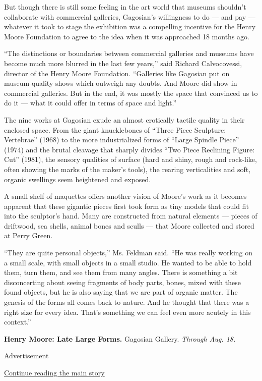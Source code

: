 But though there is still some feeling in the art world that museums
shouldn't collaborate with commercial galleries, Gagosian's willingness
to do --- and pay --- whatever it took to stage the exhibition was a
compelling incentive for the Henry Moore Foundation to agree to the idea
when it was approached 18 months ago.

``The distinctions or boundaries between commercial galleries and
museums have become much more blurred in the last few years,'' said
Richard Calvocovessi, director of the Henry Moore Foundation.
``Galleries like Gagosian put on museum-quality shows which outweigh any
doubts. And Moore did show in commercial galleries. But in the end, it
was mostly the space that convinced us to do it --- what it could offer
in terms of space and light.''

The nine works at Gagosian exude an almost erotically tactile quality in
their enclosed space. From the giant knucklebones of ``Three Piece
Sculpture: Vertebrae'' (1968) to the more industrialized forms of
``Large Spindle Piece'' (1974) and the brutal cleavage that sharply
divides ``Two Piece Reclining Figure: Cut'' (1981), the sensory
qualities of surface (hard and shiny, rough and rock-like, often showing
the marks of the maker's tools), the rearing verticalities and soft,
organic swellings seem heightened and exposed.

A small shelf of maquettes offers another vision of Moore's work as it
becomes apparent that these gigantic pieces first took form as tiny
models that could fit into the sculptor's hand. Many are constructed
from natural elements --- pieces of driftwood, sea shells, animal bones
and sculls --- that Moore collected and stored at Perry Green.

``They are quite personal objects,'' Ms. Feldman said. ``He was really
working on a small scale, with small objects in a small studio. He
wanted to be able to hold them, turn them, and see them from many
angles. There is something a bit disconcerting about seeing fragments of
body parts, bones, mixed with these found objects, but he is also saying
that we are part of organic matter. The genesis of the forms all comes
back to nature. And he thought that there was a right size for every
idea. That's something we can feel even more acutely in this context.''

\textbf{Henry Moore: Late Large Forms.} Gagosian Gallery. \emph{Through
Aug. 18.}

Advertisement

\protect\hyperlink{after-bottom}{Continue reading the main story}


